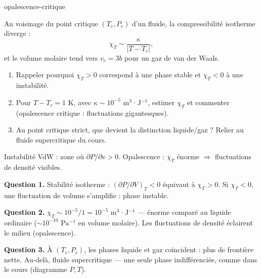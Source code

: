 \begin{exo}{opalescence-critique}

Au voisinage du point critique $(T_c, P_c)$ d'un fluide, la compressibilité isotherme diverge :
\[
\chi_T \sim \frac{\kappa}{|T - T_c|},
\]
et le volume molaire tend vers $v_c = 3b$ pour un gaz de van der Waals.

\begin{enumerate}
\item Rappeler pourquoi $\chi_T > 0$ correspond à une phase stable et $\chi_T < 0$ à une instabilité.
\item Pour $T - T_c = 1$ K, avec $\kappa \sim 10^{-5}$ m$^3$·J$^{-1}$, estimer $\chi_T$ et commenter (opalescence critique : fluctuations gigantesques).
\item Au point critique strict, que devient la distinction liquide/gaz ? Relier au fluide supercritique du cours.
\end{enumerate}

\begin{indication}
Instabilité VdW : zone où $\partial P/\partial v > 0$. Opalescence : $\chi_T$ énorme $\Rightarrow$ fluctuations de densité visibles.
\end{indication}

\begin{solution}
\textbf{Question 1.} Stabilité isotherme : $\left(\partial P/\partial V\right)_T < 0$ équivaut à $\chi_T > 0$. Si $\chi_T < 0$, une fluctuation de volume s'amplifie : phase instable.

\textbf{Question 2.} $\chi_T \sim 10^{-5}/1 = 10^{-5}$ m$^3$·J$^{-1}$ — énorme comparé au liquide ordinaire ($\sim10^{-10}$ Pa$^{-1}$ en volume molaire). Les fluctuations de densité éclairent le milieu (opalescence).

\textbf{Question 3.} À $(T_c, P_c)$, les phases liquide et gaz coïncident : plus de frontière nette. Au-delà, fluide supercritique — une seule phase indifférenciée, comme dans le cours (diagramme $P,T$).
\end{solution}
\end{exo}

